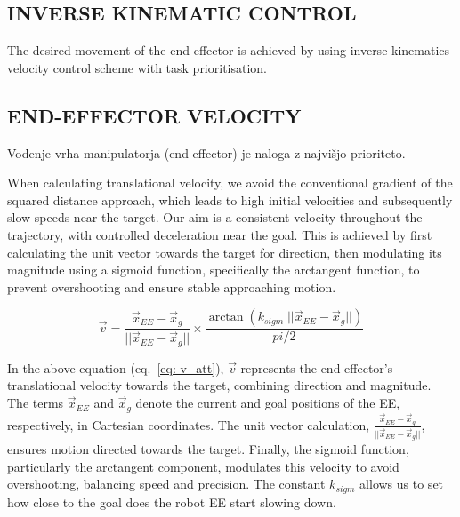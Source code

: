 \documentclass[letterpaper, 10 pt, conference]{ieeeconf}  %
\begin{document}
\subsection{INVERSE KINEMATIC CONTROL}

The desired movement of the end-effector is achieved by using inverse kinematics velocity control scheme with task prioritisation. 


\subsection{END-EFFECTOR VELOCITY}

Vodenje vrha manipulatorja (end-effector) je naloga z najvišjo prioriteto. 


When calculating translational velocity, we avoid the conventional gradient of the squared distance approach, which leads to high initial velocities and subsequently slow speeds near the target. Our aim is a consistent velocity throughout the trajectory, with controlled deceleration near the goal. This is achieved by first calculating the unit vector towards the target for direction, then modulating its magnitude using a sigmoid function, specifically the arctangent function, to prevent overshooting and ensure stable approaching motion.

\begin{equation} 
	\vec{v} = \frac{\vec{x}_{EE} - \vec{x}_g}{||\vec{x}_{EE} - \vec{x}_g||} \times \frac{\arctan(k_{sigm} \; ||\vec{x}_{EE} - \vec{x}_g||) }{pi/2}
	\label{eq: v_att}
\end{equation}

In the above equation (eq.~\ref{eq: v_att}), $\vec{v}$  represents the end effector's translational velocity towards the target, combining direction and magnitude. The terms $\vec{x}_{EE}$ and $\vec{x}_g$ denote the current and goal positions of the EE, respectively, in Cartesian coordinates. The unit vector calculation, $\frac{\vec{x}_{EE}-\vec{x}_g}{||\vec{x}_{EE}-\vec{x}_g||}$, ensures motion directed towards the target. Finally, the sigmoid function, particularly the arctangent component, modulates this velocity to avoid overshooting, balancing speed and precision. The constant $k_{sigm}$ allows us to set how close to the goal does the robot EE start slowing down.
\end{document}
